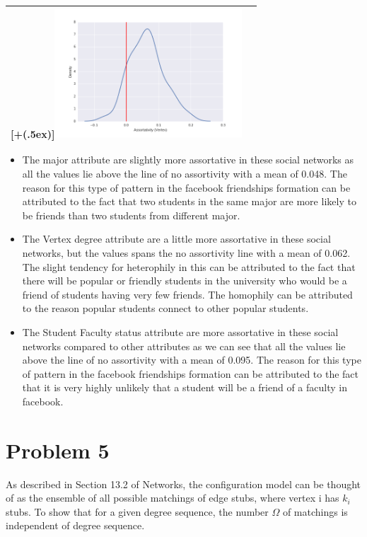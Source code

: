 \documentclass{article}
\newcommand*{\addheight}[2][.5ex]{%
  \raisebox{0pt}[\dimexpr\height+(#1)\relax]{#2}%
}
\begin{document}
\begin{table}[H]
\begin{tabular}{|c|c|}
    \addheight{\includegraphics[width=70mm]{images/Vertex_density.png}} \\
    \hline
\end{tabular}
\end{table}

\begin{itemize}
\item
The major attribute are slightly more assortative in these social networks as all the values lie above the line of no assortivity with a mean of 0.048. The reason for this type of pattern in the facebook friendships formation can be attributed to the fact that two students in the same major are more likely to be friends than two students from different major.

\item
The Vertex degree attribute are a little more assortative in these social networks, but the values spans the no assortivity line with a mean of 0.062. The slight tendency for heterophily in this can be attributed to the fact that there will be popular or friendly students in the university who would be a friend of students having very few friends. The homophily can be attributed to the reason popular students connect to other popular students.

\item
The Student Faculty status attribute are more assortative in these social networks compared to other attributes as we can see that all the values lie above the line of no assortivity with a mean of 0.095. The reason for this type of pattern in the facebook friendships formation can be attributed to the fact that it is very highly unlikely that a student will be a friend of a faculty in facebook.
\end{itemize}
  

 
\newpage
\section*{Problem 5}
As described in Section 13.2 of Networks, the configuration model can be thought of as the ensemble of all possible matchings of edge stubs, where vertex i has $k_i$ stubs. To show that for a given degree sequence, the number $\Omega$ of matchings is independent of degree sequence.\\
\end{document}
